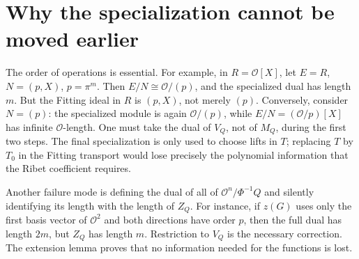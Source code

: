 \documentclass[11pt]{article}
\newcommand{\OO}{\mathcal O}\newcommand{\FF}{\operatorname{Fitt}_0}\newcommand{\len}{\operatorname{length}_{\OO}}\newcommand{\val}{\operatorname{v}}\newcommand{\Hom}{\operatorname{Hom}}\newcommand{\Span}{\operatorname{span}}\newcommand{\code}[1]{\texttt{\detokenize{#1}}}
\begin{document}
\section{Why the specialization cannot be moved earlier}
The order of operations is essential. For example, in $R=\OO[X]$, let $E=R$, $N=(p,X)$, $p=\pi^m$. Then $E/N\cong\OO/(p)$, and the specialized dual has length $m$. But the Fitting ideal in $R$ is $(p,X)$, not merely $(p)$. Conversely, consider $N=(p)$: the specialized module is again $\OO/(p)$, while $E/N=(\OO/p)[X]$ has infinite $\OO$-length. One must take the dual of $V_Q$, not of $M_Q$, during the first two steps. The final specialization is only used to choose lifts in $T$; replacing $T$ by $T_0$ in the Fitting transport would lose precisely the polynomial information that the Ribet coefficient requires.

Another failure mode is defining the dual of all of $\OO^n/\Phi^{-1}Q$ and silently identifying its length with the length of $Z_Q$. For instance, if $z(G)$ uses only the first basis vector of $\OO^2$ and both directions have order $p$, then the full dual has length $2m$, but $Z_Q$ has length $m$. Restriction to $V_Q$ is the necessary correction. The extension lemma proves that no information needed for the functions is lost.
\end{document}
